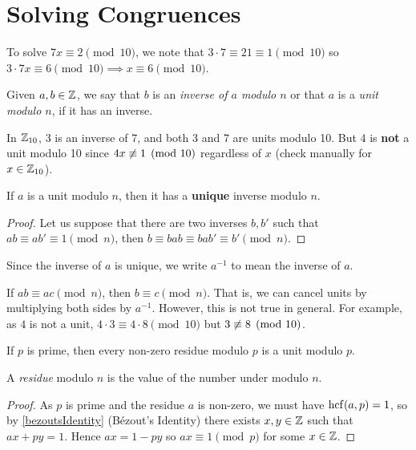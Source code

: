 \documentclass[../main.tex]{subfiles}
\begin{document}
\section{Solving Congruences}
\begin{example}
  To solve $7x \equiv 2 \pmod{10}$, we note that $3\cdot 7 \equiv 21 \equiv 1 \pmod{10}$ so $3 \cdot 7x \equiv 6 \pmod{10} \implies x \equiv 6 \pmod{10}$.
\end{example}
\begin{definition}
  Given $a, b \in \mathbb{Z}$, we say that $b$ is an \textit{inverse of $a$ modulo $n$} or that $a$ is a \textit{unit modulo $n$}, if it has an inverse.
\end{definition}
\begin{example}
  In $\mathbb{Z}_{10}$, 3 is an inverse of 7, and both 3 and 7 are units modulo 10.
  But 4 is \textbf{not} a unit modulo 10 since $4x \centernot\equiv 1 \pmod{10}$ regardless of $x$ (check manually for $x \in \mathbb{Z}_{10}$).
\end{example}
\begin{proposition}
  If $a$ is a unit modulo $n$, then it has a \textbf{unique} inverse modulo $n$.
\end{proposition}
\begin{proof}
    Let us suppose that there are two inverses $b, b'$ such that $ab \equiv ab' \equiv 1 \pmod{n}$, then $b \equiv bab \equiv bab' \equiv b' \pmod{n}$.
\end{proof}
\begin{remark}[Notation]
  Since the inverse of $a$ is unique, we write $a^{-1}$ to mean the inverse of $a$.
\end{remark}
If $ab \equiv ac \pmod{n}$, then $b \equiv c \pmod{n}$.
That is, we can cancel units by multiplying both sides by $a^{-1}$.
However, this is not true in general.
For example, as $4$ is not a unit, $4 \cdot 3 \equiv 4 \cdot 8 \pmod{10}$ but $3 \centernot\equiv 8 \pmod{10}$.
\begin{proposition}
  If $p$ is prime, then every non-zero residue modulo $p$ is a unit modulo $p$.
\end{proposition}
\begin{remark}[Note]
  A \textit{residue} modulo $n$ is the value of the number under modulo $n$.
\end{remark}
\begin{proof}
  As $p$ is prime and the residue $a$ is non-zero, we must have $\operatorname{hcf}(a, p) = 1$, so by \cref{bezoutsIdentity} (B\'ezout's Identity) there exists $x, y \in \mathbb{Z}$ such that $ax + py = 1$.
  Hence $ax = 1 - py$ so $ax \equiv 1 \pmod{p}$ for some $x \in \mathbb{Z}$.
\end{proof}
\end{document}
